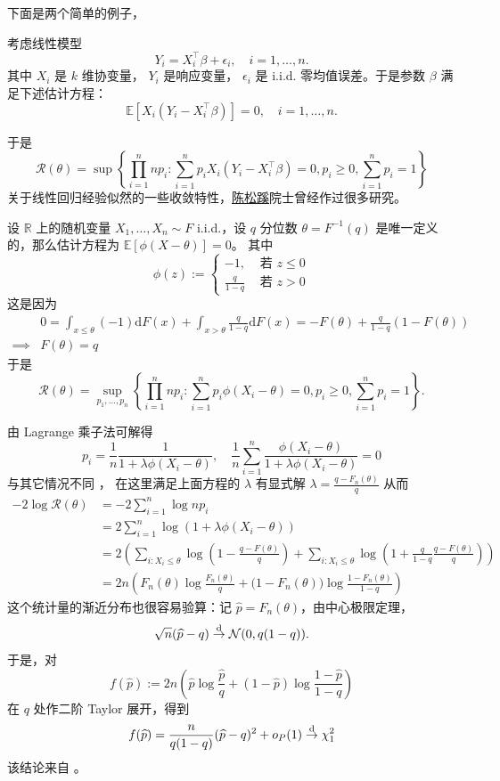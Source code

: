 下面是两个简单的例子，

\begin{example}[线性回归]
考虑线性模型
\[
Y_i=X_i^\top\beta+\epsilon_i,\quad i=1,\dots,n.
\]
其中 $X_i$ 是 $k$ 维协变量， $Y_i$ 是响应变量， $\epsilon_i$ 是 i.i.d. 零均值误差。于是参数 $\beta$ 满足下述估计方程：
\[
\mathbb{E}[X_i(Y_i-X_i^\top\beta)]=0,\quad i=1,\dots,n.
\]

于是 $$\mathcal R(\theta)=\sup\left\{\prod_{i=1}^nnp_i:\sum_{i=1}^np_iX_i(Y_i-X_i^\top\beta)=0,p_i\ge 0,\sum_{i=1}^np_i=1\right\}$$ 
关于线性回归经验似然的一些收敛特性，\href{https://www.stat.tsinghua.edu.cn/info/1023/2408.htm}{陈松蹊}院士曾经作过很多研究。


\end{example}

\begin{example}[分位数]
设 $\mathbb R$ 上的随机变量 $X_1,\dots,X_n\sim F$ i.i.d.，设 $q$ 分位数 $\theta=F^{-1}(q)$ 是唯一定义的，那么估计方程为 $\mathbb{E}[\phi(X-\theta)]=0$。
其中\[ \phi(z):=\begin{cases} -1,&\text{ 若 }z\le 0\\ \frac q{1-q}&\text{ 若 }z>0 \end{cases} \]
这是因为
\[\begin{aligned} &0=\int_{x \le \theta} (-1) \mathrm{d}F(x) + \int_{x > \theta} \frac{q}{1-q} \mathrm{d}F(x) =-F(\theta) + \frac{q}{1-q} (1 - F(\theta))\\ \implies & F(\theta)=q \end{aligned}\]
于是
\[
\mathcal R(\theta)=\sup_{p_1,\dots,p_n}\left\{\prod_{i=1}^nnp_i:\sum_{i=1}^np_i\phi(X_i-\theta)=0,p_i\ge 0,\sum_{i=1}^np_i=1\right\}.
\]

由 Lagrange 乘子法可解得 
$$p_i = \frac{1}{n}\frac{1}{1 + \lambda \phi (X_i-\theta)},\quad \frac1n\sum_{i=1}^n\frac{\phi(X_i-\theta)}{1+\lambda \phi(X_i-\theta)}=0$$
与其它情况不同 ， 在这里满足上面方程的 $\lambda$ 有显式解 $\lambda=\frac{q-F_n(\theta)}{q}$ 从而
\[\begin{aligned} -2\log \mathcal R(\theta)&=-2\sum_{i=1}^n\log np_i\\ &=2\sum_{i=1}^n\log (1+\lambda\phi(X_i-\theta))\\ &=2\left(\sum_{i:X_i\le\theta}\log\left(1-\frac{q-F(\theta)}{q}\right)+\sum_{i:X_i\le\theta}\log\left(1+\frac{q}{1-q}\frac{q-F(\theta)}{q}\right)\right)\\ &=2n\left( F_n(\theta)\log\frac{F_n(\theta)}{q} + \bigl(1-F_n(\theta)\bigr)\log\frac{1-F_n(\theta)}{1-q} \right) \end{aligned}\]
这个统计量的渐近分布也很容易验算：记 $\widehat p=F_n(\theta)$，由中心极限定理，
\[
\sqrt n(\widehat p-q)\overset{\rm d}\to \mathcal N(0,q(1-q)).
\]
于是，对
\[
f(\widehat p):=2n\left(
\widehat p\log\frac{\widehat p}{q}
+(1-\widehat p)\log\frac{1-\widehat p}{1-q}
\right)
\]
在 $q$ 处作二阶 Taylor 展开，得到
\[\begin{aligned} f(\widehat p) = \frac{n}{q(1-q)} (\widehat p - q)^2 + o_P(1)\overset{\rm d}\to\chi_1^2 \end{aligned}\]
该结论来自 \cite{adimari1998}。


\end{example}

